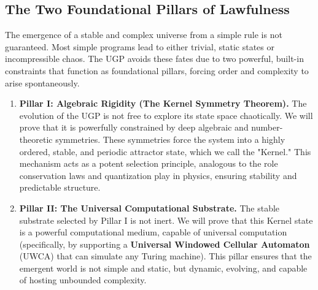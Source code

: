 \documentclass[12pt]{article}
\numberwithin{equation}{section}
\begin{document}
\subsection{The Two Foundational Pillars of Lawfulness}
The emergence of a stable and complex universe from a simple rule is not guaranteed. Most simple programs lead to either trivial, static states or incompressible chaos. The UGP avoids these fates due to two powerful, built-in constraints that function as foundational pillars, forcing order and complexity to arise spontaneously.

\begin{enumerate}
    \item \textbf{Pillar I: Algebraic Rigidity (The Kernel Symmetry Theorem).} The evolution of the UGP is not free to explore its state space chaotically. We will prove that it is powerfully constrained by deep algebraic and number-theoretic symmetries. These symmetries force the system into a highly ordered, stable, and periodic attractor state, which we call the "Kernel." This mechanism acts as a potent selection principle, analogous to the role conservation laws and quantization play in physics, ensuring stability and predictable structure.
    \item \textbf{Pillar II: The Universal Computational Substrate.} The stable substrate selected by Pillar I is not inert. We will prove that this Kernel state is a powerful computational medium, capable of universal computation (specifically, by supporting a \textbf{Universal Windowed Cellular Automaton} (UWCA) that can simulate any Turing machine). This pillar ensures that the emergent world is not simple and static, but dynamic, evolving, and capable of hosting unbounded complexity.
\end{enumerate}
\end{document}
